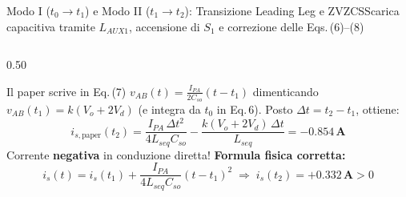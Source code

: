 \documentclass[aspectratio=169,9pt]{beamer}
\newcommand{\A}{\,\text{A}}
\begin{document}
\begin{frame}{Modo I ($t_0 \to t_1$) e Modo II ($t_1 \to t_2$): Transizione Leading Leg e ZVZCS}{Scarica capacitiva tramite $L_{AUX1}$, accensione di $S_1$ e correzione delle Eqs.\,(6)--(8)}
\begin{columns}[T,onlytextwidth]
\begin{column}{0.50\textwidth}
\begin{itemize}
      \end{itemize}
      \vspace*{1mm}
      \begin{warnbox}[title={Audit Critico su Eqs.\,(6)--(8) del Paper!}]
        Il paper scrive in Eq.\,(7) $v_{AB}(t)=\frac{I_{PA}}{2C_{so}}(t-t_1)$ dimenticando $v_{AB}(t_1)=k(V_o+2V_d)$ (e integra da $t_0$ in Eq.\,6). Posto $\Delta t = t_2 - t_1$, ottiene:
        \[
          i_{s,\text{paper}}(t_2) = \frac{I_{PA}\,\Delta t^2}{4L_{seq}C_{so}} - \frac{k(V_o+2V_d)\,\Delta t}{L_{seq}} = \mathbf{-0.854\A}
        \]
        Corrente \textbf{negativa} in conduzione diretta! \textbf{Formula fisica corretta:}
        \[
          i_s(t) = i_s(t_1) + \frac{I_{PA}}{4 L_{seq} C_{so}}(t-t_1)^2 \;\Rightarrow\; i_s(t_2) = \mathbf{+0.332\A} > 0
        \]
      \end{warnbox}
    \end{column}
  \end{columns}
\end{frame}
\end{document}
